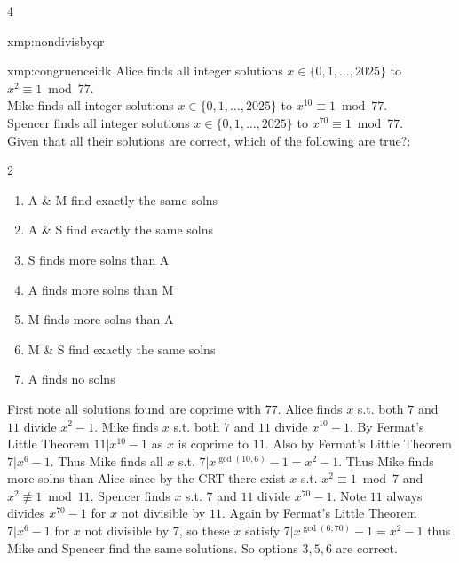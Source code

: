 \documentclass[landscape, 8pt]{extarticle}
\begin{document}
\begin{multicols*}{4}
\begin{xmp-s}{xmp:nondivisbyqr}{ }
		\end{xmp-s}
		
		
		\begin{xmp}{xmp:congruenceidk}{ }
			Alice finds all integer solutions $x\in \{0, 1, \dots, 2025\}$ to $x^2 \equiv 1 \bmod{77}$.\\
			Mike finds all integer solutions $x\in \{0, 1, \dots, 2025\}$ to $x^{10} \equiv 1 \bmod{77}$.\\
			Spencer finds all integer solutions $x\in \{0, 1, \dots, 2025\}$ to $x^{70} \equiv 1 \bmod{77}$.\\
			Given that all their solutions are correct, which of the following are true?:\\
			\vspace*{-5ex}
			\begin{multicols}{2}
				\begin{enumerate}[label=\arabic*]
					\item A \& M find exactly the same solns
					\item A \& S find exactly the same solns
					\item S finds more solns than A
					\item A finds more solns than M
					\item M finds more solns than A
					\item M \& S find exactly the same solns
					\item A finds no solns
				\end{enumerate}
			\end{multicols}
			\vspace*{-5ex}
			First note all solutions found are coprime with $77$. Alice finds $x$ s.t. both $7$ and $11$ divide $x^2 - 1$. Mike finds $x$ s.t. both $7$ and $11$ divide $x^{10}-1$. By Fermat's Little Theorem $11|x^{10}-1$ as $x$ is coprime to $11$. Also by Fermat's Little Theorem $7|x^6 -1$. Thus Mike finds all $x$ s.t. $7|x^{\gcd(10, 6)}-1 = x^2-1$. Thus Mike finds more solns than Alice since by the CRT there exist $x$ s.t. $x^2 \equiv 1 \bmod{7}$ and $x^2 \not\equiv 1 \bmod{11}$. Spencer finds $x$ s.t. $7$ and $11$ divide $x^{70} -1$. Note $11$ always divides $x^{70}-1$ for $x$ not divisible by $11$. Again by Fermat's Little Theorem $7|x^6 -1$ for $x$ not divisible by $7$, so these $x$ satisfy $7|x^{\gcd(6, 70)} -1 = x^2 -1$ thus Mike and Spencer find the same solutions. So options $3, 5, 6$ are correct.
			
		\end{xmp}
		

\end{multicols*}
\end{document}
